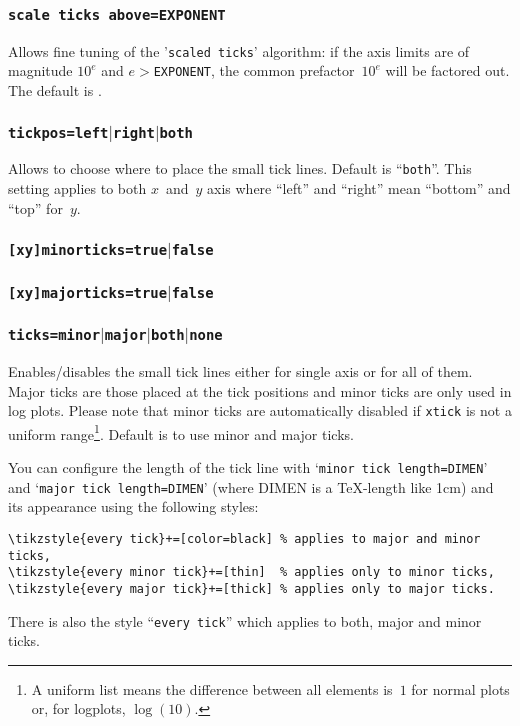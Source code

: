 \subsubsection{\texttt{scale ticks above=EXPONENT}}
Allows fine tuning of the '\texttt{scaled ticks}' algorithm: if the axis limits are of magnitude $10^e$ and $e>$\texttt{EXPONENT}, the common prefactor~$10^e$ will be factored out. The default is
\makeatletter
\pgfplots@scale@ticks@above@exponent
\makeatother.


\subsubsection{\texttt{tickpos=left$|$right$|$both}}
Allows to choose where to place the small tick lines. Default is ``\texttt{both}''. This setting applies to both $x$~and~$y$ axis where ``left'' and ``right'' mean ``bottom'' and ``top'' for~$y$.

\subsubsection{\texttt{[xy]minorticks=true$|$false}}
\subsubsection{\texttt{[xy]majorticks=true$|$false}}
\subsubsection{\texttt{ticks=minor$|$major$|$both$|$none}}
Enables/disables the small tick lines either for single axis or for all of them. Major ticks are those placed at the tick positions and minor ticks are only used in log plots. Please note that minor ticks are automatically disabled if \texttt{xtick} is not a uniform range\footnote{A uniform list means the difference between all elements is~$1$ for normal plots or, for logplots, $\log(10)$.}. Default is to use minor and major ticks.

You can configure the length of the tick line with `\texttt{minor tick length=DIMEN}' and `\texttt{major tick length=DIMEN}' (where DIMEN is a \TeX-length like 1cm) and its appearance using the following styles:
\begin{lstlisting}
\tikzstyle{every tick}+=[color=black] % applies to major and minor ticks,
\tikzstyle{every minor tick}+=[thin]  % applies only to minor ticks,
\tikzstyle{every major tick}+=[thick] % applies only to major ticks.
\end{lstlisting}
There is also the style ``\texttt{every tick}'' which applies to both, major and minor ticks.

